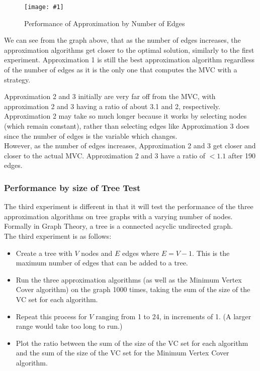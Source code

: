 \documentclass[12pt]{article}
\newcommand{\firgureBuffered}[2]
{
    \begin{figure}[ht!]
        \centering
        \texttt{[image: \#1]}
        \caption{#2}
    \end{figure}
}
\begin{document}
\FloatBarrier{}
\firgureBuffered{images/approxexperiments/Edges.png}{Performance of Approximation by Number of Edges}
\FloatBarrier{}

We can see from the graph above, that as the number of edges increases, the approximation algorithms get closer to the optimal solution, similarly to the first experiment. Approximation 1 is still the best approximation algorithm regardless of the number of edges as it is the only one that computes the MVC with a strategy.

Approximation 2 and 3 initially are very far off from the MVC, with approximation 2 and 3 having a ratio of about 3.1 and 2, respectively. Approximation 2 may take so much longer because it works by selecting nodes (which remain constant), rather than selecting edges like Approximation 3 does since the number of edges is the variable which changes. \\

However, as the number of edges increases, Approximation 2 and 3 get closer and closer to the actual MVC. Approximation 2 and 3 have a ratio of $<1.1$ after 190 edges. \\

\subsubsection{Performance by size of Tree Test}

The third experiment is different in that it will test the performance of the three approximation algorithms on tree graphs with a varying number of nodes. Formally in Graph Theory, a tree is a connected acyclic undirected graph. \\

The third experiment is as follows:

\begin{itemize}
    \item Create a tree with $V$ nodes and $E$ edges where $E = V-1$. This is the maximum number of edges that can be added to a tree.
    \item Run the three approximation algorithms (as well as the Minimum Vertex Cover algorithm) on the graph 1000 times, taking the sum of the size of the VC set for each algorithm.
    \item Repeat this process for $V$ ranging from 1 to 24, in increments of 1. (A larger range would take too long to run.)
    \item Plot the ratio between the sum of the size of the VC set for each algorithm and the sum of the size of the VC set for the Minimum Vertex Cover algorithm.
\end{itemize}
\newpage
\end{document}
